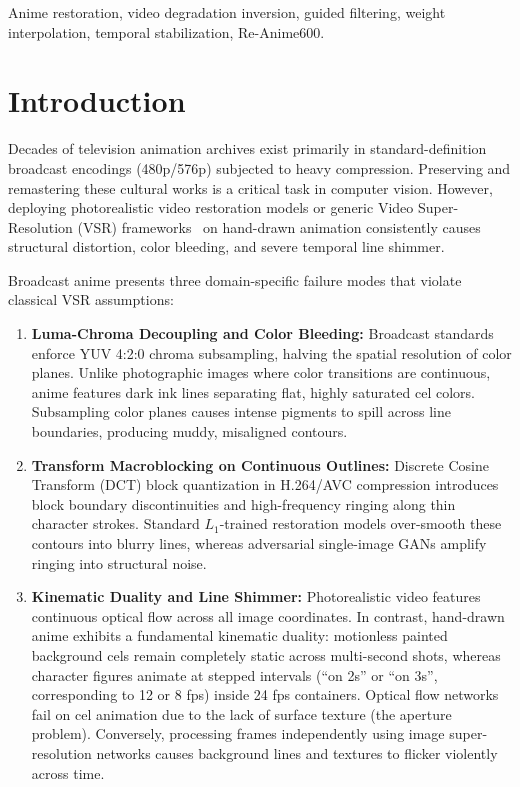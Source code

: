 \documentclass[conference]{IEEEtran}
\begin{document}
\begin{IEEEkeywords}
Anime restoration, video degradation inversion, guided filtering, weight interpolation, temporal stabilization, Re-Anime600.
\end{IEEEkeywords}

\section{Introduction}
Decades of television animation archives exist primarily in standard-definition broadcast encodings (480p/576p) subjected to heavy compression. Preserving and remastering these cultural works is a critical task in computer vision. However, deploying photorealistic video restoration models or generic Video Super-Resolution (VSR) frameworks~\cite{chan2022basicvsrpp} on hand-drawn animation consistently causes structural distortion, color bleeding, and severe temporal line shimmer.

Broadcast anime presents three domain-specific failure modes that violate classical VSR assumptions:
\begin{enumerate}
    \item \textbf{Luma-Chroma Decoupling and Color Bleeding:} Broadcast standards enforce YUV 4:2:0 chroma subsampling, halving the spatial resolution of color planes. Unlike photographic images where color transitions are continuous, anime features dark ink lines separating flat, highly saturated cel colors. Subsampling color planes causes intense pigments to spill across line boundaries, producing muddy, misaligned contours.
    \item \textbf{Transform Macroblocking on Continuous Outlines:} Discrete Cosine Transform (DCT) block quantization in H.264/AVC compression introduces block boundary discontinuities and high-frequency ringing along thin character strokes. Standard $L_1$-trained restoration models over-smooth these contours into blurry lines, whereas adversarial single-image GANs amplify ringing into structural noise.
    \item \textbf{Kinematic Duality and Line Shimmer:} Photorealistic video features continuous optical flow across all image coordinates. In contrast, hand-drawn anime exhibits a fundamental kinematic duality: motionless painted background cels remain completely static across multi-second shots, whereas character figures animate at stepped intervals (``on 2s'' or ``on 3s'', corresponding to 12 or 8 fps) inside 24 fps containers. Optical flow networks fail on cel animation due to the lack of surface texture (the aperture problem). Conversely, processing frames independently using image super-resolution networks causes background lines and textures to flicker violently across time.
\end{enumerate}
\end{document}
